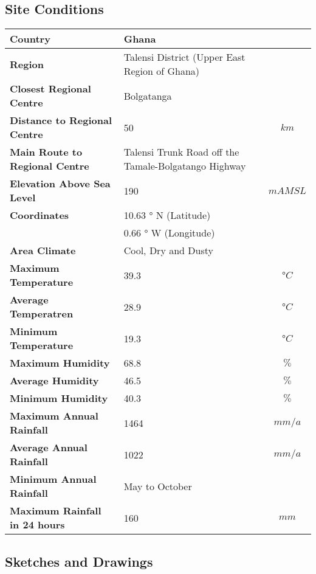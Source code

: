 \documentclass{article}%
\begin{document}
%
\subsection{Site Conditions}%
\label{subsec:SiteConditions}%
\begin{flushleft}%
\begin{minipage}{\textwidth}%
\flushleft%
\begin{tabular}{|l |l |c|}%
\hline%
\textbf{Country}&Ghana&\\%
\hline%
\textbf{Region}&Talensi District (Upper East Region of Ghana)&\\%
\hline%
\textbf{Closest Regional Centre}&Bolgatanga&\\%
\hline%
\textbf{Distance to Regional Centre}&50&$km$\\%
\hline%
\textbf{Main Route to Regional Centre}&Talensi Trunk Road off the Tamale{-}Bolgatango Highway&\\%
\hline%
\textbf{Elevation Above Sea Level}&190&$m AMSL$\\%
\hline%
\textbf{Coordinates}&10.63 ° N (Latitude)&\\%
\hline%
\textbf{}&0.66 ° W (Longitude)&\\%
\hline%
\textbf{Area Climate}&Cool, Dry and Dusty&\\%
\hline%
\textbf{Maximum Temperature}&39.3&$°C$\\%
\hline%
\textbf{Average Temperatren}&28.9&$°C$\\%
\hline%
\textbf{Minimum Temperature}&19.3&$°C$\\%
\hline%
\textbf{Maximum Humidity}&68.8&$\%$\\%
\hline%
\textbf{Average Humidity}&46.5&$\%$\\%
\hline%
\textbf{Minimum Humidity}&40.3&$\%$\\%
\hline%
\textbf{Maximum Annual Rainfall}&1464&$mm/a$\\%
\hline%
\textbf{Average Annual Rainfall}&1022&$mm/a$\\%
\hline%
\textbf{Minimum Annual Rainfall}&May to October&\\%
\hline%
\textbf{Maximum Rainfall in 24 hours}&160&$mm$\\%
\hline%
\end{tabular}%
\end{minipage}%
\end{flushleft}

%
\newpage%
\subsection{Sketches and Drawings}%
\label{subsec:SketchesandDrawings}%
\end{document}
